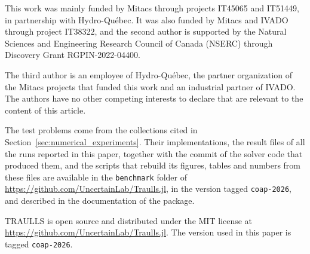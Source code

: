 \documentclass[pdflatex,sn-mathphys-num]{sn-jnl}%
\theoremstyle{thmstyleone}%
\begin{document}
 This work was mainly funded by Mitacs through projects IT45065 and IT51449, in partnership with Hydro-Qu\'ebec. It was also funded by Mitacs and IVADO through project IT38322, and the second author is supported by the Natural Sciences and Engineering Research Council of Canada (NSERC) through Discovery Grant RGPIN-2022-04400.

 The third author is an employee of Hydro-Qu\'ebec, the partner organization of the Mitacs projects that funded this work and an industrial partner of IVADO. The authors have no other competing interests to declare that are relevant to the content of this article.

 The test problems come from the collections cited in Section~\ref{sec:numerical_experiments}. Their implementations, the result files of all the runs reported in this paper, together with the commit of the solver code that produced them, and the scripts that rebuild its figures, tables and numbers from these files are available in the \texttt{benchmark} folder of \url{https://github.com/UncertainLab/Traulls.jl}, in the version tagged \texttt{coap-2026}, and described in the documentation of the package.

 TRAULLS is open source and distributed under the MIT license at \url{https://github.com/UncertainLab/Traulls.jl}. The version used in this paper is tagged \texttt{coap-2026}.
\end{document}
